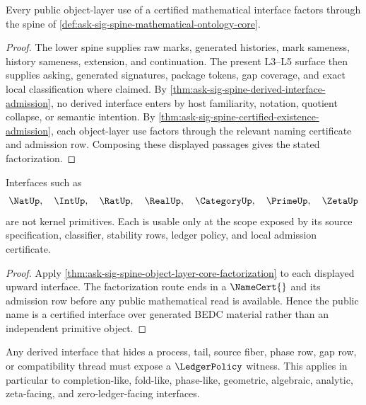 \begin{theorem}
\label{thm:ask-sig-spine-object-layer-core-factorization}
Every public object-layer use of a certified mathematical interface factors
through the spine of
\autoref{def:ask-sig-spine-mathematical-ontology-core}.
\end{theorem}

\begin{proof}
The lower spine supplies raw marks, generated histories, mark sameness,
history sameness, extension, and continuation.  The present L3--L5 surface
then supplies asking, generated signatures, package tokens, gap coverage,
and exact local classification where claimed.  By
\autoref{thm:ask-sig-spine-derived-interface-admission}, no derived
interface enters by host familiarity, notation, quotient collapse, or
semantic intention.  By
\autoref{thm:ask-sig-spine-certified-existence-admission}, each object-layer
use factors through the relevant naming certificate and admission row.
Composing these displayed passages gives the stated factorization.
\end{proof}

\begin{corollary}
\label{cor:ask-sig-spine-mature-names-certificate-consumers}
Interfaces such as
$$
\NatUp,\quad
\IntUp,\quad
\RatUp,\quad
\RealUp,\quad
\CategoryUp,\quad
\PrimeUp,\quad
\ZetaUp
$$
are not kernel primitives.  Each is usable only at the scope exposed by its
source specification, classifier, stability rows, ledger policy, and local
admission certificate.
\end{corollary}

\begin{proof}
Apply
\autoref{thm:ask-sig-spine-object-layer-core-factorization}
to each displayed upward interface.  The factorization route ends in a
$\NameCert{}$ and its admission row before any public mathematical read is
available.  Hence the public name is a certified interface over generated
BEDC material rather than an independent primitive object.
\end{proof}

\begin{principle}
\label{prin:ask-sig-spine-ledger-policy-hidden-material}
Any derived interface that hides a process, tail, source fiber, phase row,
gap row, or compatibility thread must expose a $\LedgerPolicy$ witness.
This applies in particular to completion-like, fold-like, phase-like,
geometric, algebraic, analytic, zeta-facing, and zero-ledger-facing
interfaces.
\end{principle}

